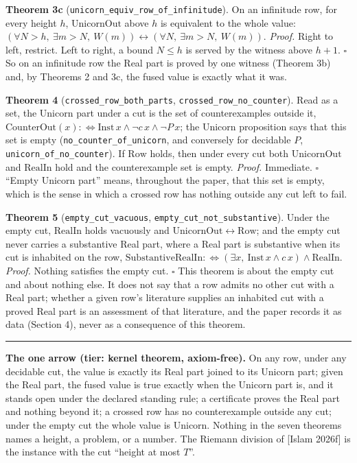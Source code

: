 \documentclass[10pt]{article}
\newenvironment{jbox}{\par\vspace{2pt}\noindent\color{accent}\rule{\columnwidth}{0.8pt}\par\vspace{-2pt}\small}{\par\vspace{2pt}}
\begin{document}
\textbf{Theorem 3c} (\texttt{unicorn\_equiv\_row\_of\_infinitude}). On
an infinitude row, for every height \(h\), \(\mathrm{UnicornOut}\) above
\(h\) is equivalent to the whole value:
\((\forall N > h,\ \exists m > N,\ W(m)) \leftrightarrow (\forall N,\ \exists m > N,\ W(m))\).
\emph{Proof.} Right to left, restrict. Left to right, a bound
\(N \le h\) is served by the witness above \(h + 1\). \(\square\) So on
an infinitude row the Real part is proved by one witness (Theorem 3b)
and, by Theorems 2 and 3c, the fused value is exactly what it was.

\textbf{Theorem 4} (\texttt{crossed\_row\_both\_parts},
\texttt{crossed\_row\_no\_counter}). Read as a set, the Unicorn part
under a cut is the set of counterexamples outside it,
\(\mathrm{CounterOut}(x) :\Leftrightarrow \mathrm{Inst}\,x \wedge \neg c\,x \wedge \neg P\,x\);
the Unicorn proposition says that this set is empty
(\texttt{no\_counter\_of\_unicorn}, and conversely for decidable \(P\),
\texttt{unicorn\_of\_no\_counter}). If \(\mathrm{Row}\) holds, then
under every cut both \(\mathrm{UnicornOut}\) and \(\mathrm{RealIn}\)
hold and the counterexample set is empty. \emph{Proof.} Immediate.
\(\square\) ``Empty Unicorn part'' means, throughout the paper, that
this set is empty, which is the sense in which a crossed row has nothing
outside any cut left to fail.

\textbf{Theorem 5} (\texttt{empty\_cut\_vacuous},
\texttt{empty\_cut\_not\_substantive}). Under the empty cut,
\(\mathrm{RealIn}\) holds vacuously and
\(\mathrm{UnicornOut} \leftrightarrow \mathrm{Row}\); and the empty cut
never carries a substantive Real part, where a Real part is substantive
when its cut is inhabited on the row,
\(\mathrm{SubstantiveRealIn} :\Leftrightarrow (\exists x,\ \mathrm{Inst}\,x \wedge c\,x) \wedge \mathrm{RealIn}\).
\emph{Proof.} Nothing satisfies the empty cut. \(\square\) This theorem
is about the empty cut and about nothing else. It does not say that a
row admits no other cut with a Real part; whether a given row's
literature supplies an inhabited cut with a proved Real part is an
assessment of that literature, and the paper records it as data (Section
4), never as a consequence of this theorem.

\begin{jbox}
\textbf{The one arrow (tier: kernel theorem, axiom-free).} On any row, under any decidable cut, the value is exactly its Real part joined to its Unicorn part; given the Real part, the fused value is true exactly when the Unicorn part is, and it stands open under the declared standing rule; a certificate proves the Real part and nothing beyond it; a crossed row has no counterexample outside any cut; under the empty cut the whole value is Unicorn. Nothing in the seven theorems names a height, a problem, or a number. The Riemann division of [Islam 2026f] is the instance with the cut ``height at most $T$''.
\end{jbox}
\end{document}
